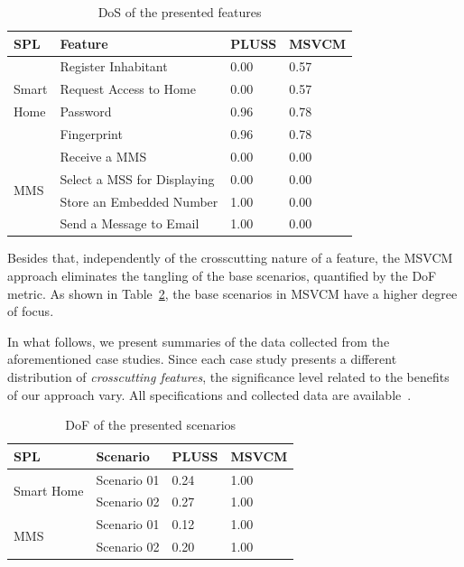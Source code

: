 \begin{table}[thb]
\centering
\caption{DoS of the presented features}
\label{tab:feature-dos}
\begin{small}
\begin{tabular}{p{0.25in}lll} \hline
SPL							&	Feature						& PLUSS	& MSVCM	\\ \hline 
 							&	Register Inhabitant				& 0.00  & 0.57  \\
Smart						&	Request Access to Home			& 0.00  & 0.57  \\ 
Home						&	Password						& 0.96  & 0.78  \\ 
							&	Fingerprint					& 0.96  & 0.78  \\ \hline
\multirow{4}{*}{MMS}	 		&	Receive a MMS				& 0.00  & 0.00  \\ 
							&	Select a MSS for Displaying		& 0.00  & 0.00  \\ 
							& 	Store an Embedded Number		& 1.00  & 0.00  \\
							& 	Send a Message to Email			& 1.00  & 0.00  \\ \hline		
\end{tabular}
\end{small}
\end{table}

Besides that, independently of the crosscutting nature of a feature, the
MSVCM approach eliminates the tangling of the base scenarios, quantified by
the DoF metric. As shown in Table~\ref{tab:scenario-dof}, the base scenarios in
MSVCM have a higher degree of focus. 

In what follows, we present summaries of the data collected from the
aforementioned case studies. Since each case study presents a different distribution of
\emph{crosscutting features}, the significance level related to the benefits
of our approach vary. All specifications and collected data are available~\cite{SPG:site}.


\begin{table}[htb]
\centering
\caption{DoF of the presented scenarios}
\label{tab:scenario-dof}
\begin{small}
\begin{tabular}{llll} \hline
SPL							&	Scenario		& PLUSS	& MSVCM	\\ \hline
\multirow{2}{*}{Smart Home} &	Scenario 01		& 0.24  & 1.00  \\
							&	Scenario 02		& 0.27  & 1.00  \\ \hline
\multirow{2}{*}{MMS} 		&	Scenario 01		& 0.12  & 1.00  \\ 
							&	Scenario 02		& 0.20  & 1.00  \\ \hline
\end{tabular}
\end{small}
\end{table}

